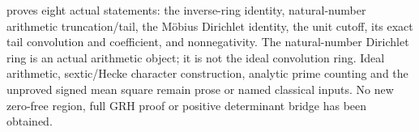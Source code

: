  proves eight actual statements: the inverse-ring
identity, natural-number arithmetic truncation/tail, the M\"obius Dirichlet
identity, the unit cutoff, its exact tail convolution and coefficient,
and nonnegativity. The natural-number Dirichlet ring is an actual
arithmetic object; it is not the ideal convolution ring. Ideal arithmetic,
sextic/Hecke character construction, analytic prime counting and the
unproved signed mean square remain prose or named classical inputs.
No new zero-free region, full GRH proof or positive determinant bridge
has been obtained.

